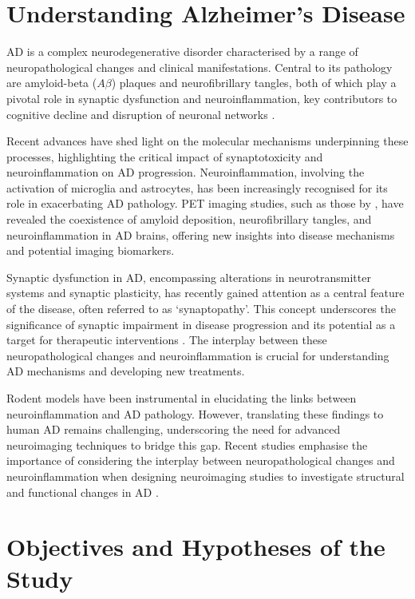 \documentclass[10pt]{article}
\begin{document}
\begin{sloppypar}
  \section{Understanding Alzheimer’s Disease}
  \label{sec:alzheimers-disease}

  AD is a complex neurodegenerative disorder characterised by a range of neuropathological changes and clinical manifestations. Central to its pathology are amyloid-beta ($A\beta$) plaques and neurofibrillary tangles, both of which play a pivotal role in synaptic dysfunction and neuroinflammation, key contributors to cognitive decline and disruption of neuronal networks \citep{heneka_neuroinflammation_2015}.

  Recent advances have shed light on the molecular mechanisms underpinning these processes, highlighting the critical impact of synaptotoxicity and neuroinflammation on AD progression. Neuroinflammation, involving the activation of microglia and astrocytes, has been increasingly recognised for its role in exacerbating AD pathology. PET imaging studies, such as those by \cite{zhou_pet_2021}, have revealed the coexistence of amyloid deposition, neurofibrillary tangles, and neuroinflammation in AD brains, offering new insights into disease mechanisms and potential imaging biomarkers.

  Synaptic dysfunction in AD, encompassing alterations in neurotransmitter systems and synaptic plasticity, has recently gained attention as a central feature of the disease, often referred to as ‘synaptopathy’. This concept underscores the significance of synaptic impairment in disease progression and its potential as a target for therapeutic interventions \citep{meftah_alzheimers_2023}. The interplay between these neuropathological changes and neuroinflammation is crucial for understanding AD mechanisms and developing new treatments.

  Rodent models have been instrumental in elucidating the links between neuroinflammation and AD pathology. However, translating these findings to human AD remains challenging, underscoring the need for advanced neuroimaging techniques to bridge this gap. Recent studies emphasise the importance of considering the interplay between neuropathological changes and neuroinflammation when designing neuroimaging studies to investigate structural and functional changes in AD \citep{nazem_rodent_2015}.

  \section{Objectives and Hypotheses of the Study}
  \label{sec:objectives-and-hypotheses}


\end{sloppypar}
\end{document}
